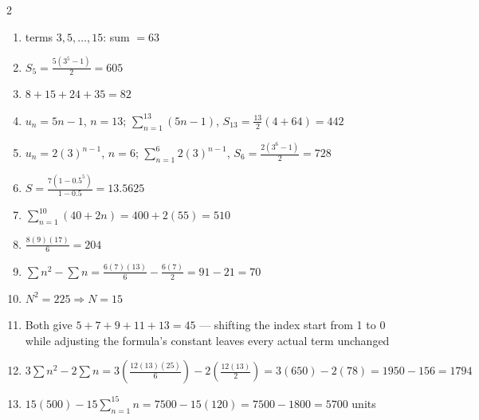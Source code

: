 \documentclass[11pt]{article}
\begin{document}
\begin{keybox}
\begin{multicols}{2}
\small
\begin{enumerate}[leftmargin=*,itemsep=3pt]
  \item terms $3,5,\dots,15$: sum $=63$
  \item $S_5=\tfrac{5(3^5-1)}{2}=605$
  \item $8+15+24+35=82$
  \item $u_n=5n-1$, $n=13$; $\sum_{n=1}^{13}(5n-1)$, $S_{13}=\tfrac{13}{2}(4+64)=442$
  \item $u_n=2(3)^{n-1}$, $n=6$; $\sum_{n=1}^{6}2(3)^{n-1}$, $S_6=\tfrac{2(3^6-1)}{2}=728$
  \item $S=\tfrac{7(1-0.5^5)}{1-0.5}=13.5625$
  \item $\sum_{n=1}^{10}(40+2n)=400+2(55)=510$
  \item $\tfrac{8(9)(17)}6=204$
  \item $\sum n^2-\sum n=\tfrac{6(7)(13)}6-\tfrac{6(7)}2=91-21=70$
  \item $N^2=225\Rightarrow N=15$
  \item Both give $5+7+9+11+13=45$ --- shifting the index start from 1 to 0 while adjusting the formula's constant leaves every actual term unchanged
  \item $3\sum n^2-2\sum n=3\left(\tfrac{12(13)(25)}6\right)-2\left(\tfrac{12(13)}2\right)=3(650)-2(78)=1950-156=1794$
  \item $15(500)-15\sum_{n=1}^{15}n=7500-15(120)=7500-1800=5700$ units
\end{enumerate}
\end{multicols}
\end{keybox}
\end{document}
